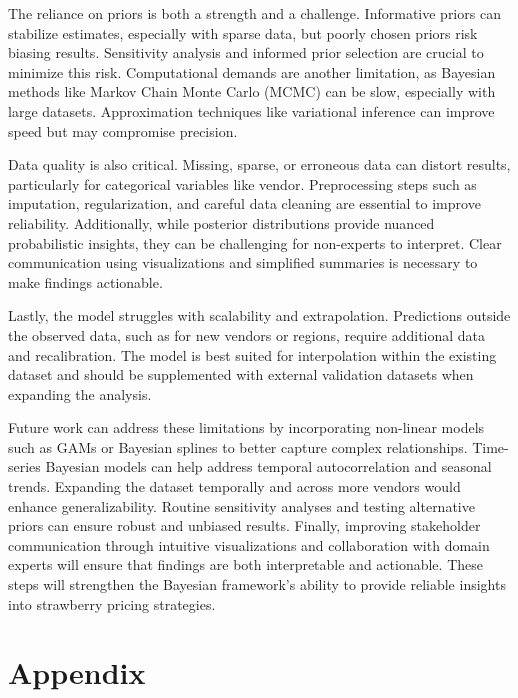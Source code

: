 \documentclass[
  letterpaper,
  DIV=11,
  numbers=noendperiod]{scrartcl}
\begin{document}
The reliance on priors is both a strength and a challenge. Informative
priors can stabilize estimates, especially with sparse data, but poorly
chosen priors risk biasing results. Sensitivity analysis and informed
prior selection are crucial to minimize this risk. Computational demands
are another limitation, as Bayesian methods like Markov Chain Monte
Carlo (MCMC) can be slow, especially with large datasets. Approximation
techniques like variational inference can improve speed but may
compromise precision.

Data quality is also critical. Missing, sparse, or erroneous data can
distort results, particularly for categorical variables like vendor.
Preprocessing steps such as imputation, regularization, and careful data
cleaning are essential to improve reliability. Additionally, while
posterior distributions provide nuanced probabilistic insights, they can
be challenging for non-experts to interpret. Clear communication using
visualizations and simplified summaries is necessary to make findings
actionable.

Lastly, the model struggles with scalability and extrapolation.
Predictions outside the observed data, such as for new vendors or
regions, require additional data and recalibration. The model is best
suited for interpolation within the existing dataset and should be
supplemented with external validation datasets when expanding the
analysis.

Future work can address these limitations by incorporating non-linear
models such as GAMs or Bayesian splines to better capture complex
relationships. Time-series Bayesian models can help address temporal
autocorrelation and seasonal trends. Expanding the dataset temporally
and across more vendors would enhance generalizability. Routine
sensitivity analyses and testing alternative priors can ensure robust
and unbiased results. Finally, improving stakeholder communication
through intuitive visualizations and collaboration with domain experts
will ensure that findings are both interpretable and actionable. These
steps will strengthen the Bayesian framework's ability to provide
reliable insights into strawberry pricing strategies.

\newpage

\appendix

\section*{Appendix}\label{appendix}
\end{document}
